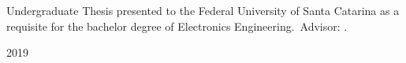 \begin{titlepage}
  \begin{center}
    {\large \MakeUppercase{\theauthor}}
  \end{center}

  \vfill

  \begin{center}
    {\Large \bfseries \MakeUppercase{\thetitle}}
  \end{center}
  \begin{flushright}
  	\begin{minipage}{0.5\textwidth}
     Undergraduate Thesis presented to the Federal University of Santa
     Catarina as a requisite for the bachelor degree of Electronics 
     Engineering.\ Advisor: \theadvisor. %
  	\end{minipage}
  \end{flushright}
  

  \vfill

  \begin{center}
    {\large \bfseries \MakeUppercase{\theplace} \par 2019}
  \end{center}
\end{titlepage}
